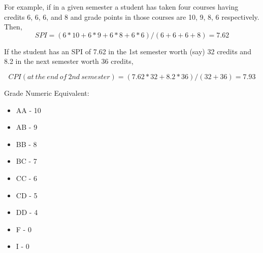 \documentclass[12pt,  letterpaper,  twoside]{article}
\begin{document}
For example, if in a given semester a student has taken four courses having 
credits 6, 6, 6, and 8
and grade points in those courses are 10, 9, 8, 6 respectively. Then,
\begin{equation}
	SPI = (6 * 10 + 6 * 9 + 6 * 8 + 6 * 6) / (6 + 6 + 6 + 8) = 7.62
\end{equation}




If the student has an SPI of 7.62 in the 1st semester worth (say) 32 credits 
and 8.2 in the next
semester worth 36 credits,


\begin{equation}
	CPI (at\ the\ end\ of\ 2nd\ semester) = (7.62 * 32 + 8.2 * 36) / (32 + 36) 
	= 7.93
\end{equation}





Grade Numeric Equivalent:
\begin{itemize}
	\item AA - 10
	\item AB - 9
	\item BB - 8
	\item BC - 7
	\item CC - 6
	\item CD - 5
	\item DD - 4
	\item F - 0
	\item I - 0
\end{itemize}
	
\end{document}
